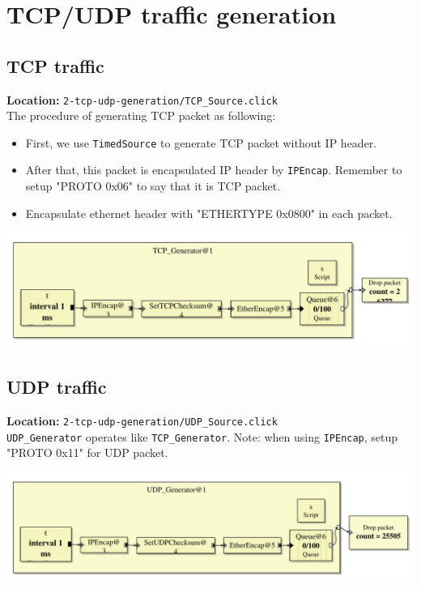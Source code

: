 \documentclass[a4paper]{article}
\begin{document}
  \section{TCP/UDP traffic generation}
  \subsection{TCP traffic}
  \textbf{Location:} \texttt{2-tcp-udp-generation/TCP\_Source.click} \\
  The procedure of generating TCP packet as following:
  \begin{itemize}
  	\item First, we use \texttt{TimedSource} to generate TCP packet without IP header.
  	\item After that, this packet is encapsulated IP header by \texttt{IPEncap}. Remember to setup "PROTO 0x06" to say that it is TCP packet.
  	\item Encapsulate ethernet header with "ETHERTYPE 0x0800" in each packet.
  \end{itemize}
  \begin{center}
	  \includegraphics[scale=0.55]{TCP_Source.pdf}
	  \label{fig:tcpsource}
  \end{center}
  \subsection{UDP traffic}
  \textbf{Location:} \texttt{2-tcp-udp-generation/UDP\_Source.click} \\
  \texttt{UDP\_Generator} operates like \texttt{TCP\_Generator}. Note: when using \texttt{IPEncap}, setup "PROTO 0x11" for UDP packet.
    \begin{center}
	  \includegraphics[scale=0.55]{UDP_Source.pdf}
	  \label{fig:udpsource}
  \end{center}
\end{document}
